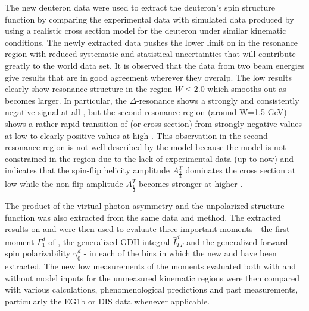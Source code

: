 The new deuteron data were used to extract the deuteron's spin structure function \gones by 
comparing the experimental data with simulated data produced by using a 
realistic cross section model for the deuteron under similar kinematic conditions. %
%
The newly extracted data pushes the lower limit on \qsqs in the resonance region with reduced 
systematic and statistical uncertainties that will contribute greatly to the world data set. 
It is observed that the data from two beam energies give results that are in good agreement 
wherever they overalp. The low \qsqs results clearly show resonance structure in the region 
$W \le 2.0$ which smooths out as \qsqs becomes larger. In particular, the $\Delta$-resonance 
shows a strongly and consistently negative signal at all \qsq, but the second resonance region 
(around W=1.5 GeV) shows a rather %
rapid transition of \gones (or cross section) from 
strongly negative values at low \qsqs to clearly positive values at high \qsq. 
This observation in the second resonance region 
is not well described by the model because the model is not constrained in the region due to the lack 
of experimental data (up to now) and indicates that the spin-flip helicity amplitude $A^T_{\frac{3}{2}}$ dominates 
the cross section at low \qsqs while the non-flip amplitude $A^T_{\frac{1}{2}}$ becomes stronger 
at higher \qsq.


The product \afones of the virtual photon asymmetry \aones and the unpolarized structure function 
\fones was also extracted from the same %
data %
and method.
The extracted results on \gones and \afones were then used to evaluate %
three important moments - the first moment $\Gamma^d_1$ of \gone, the generalized GDH integral $\bar{I}^d_{TT}$ and the generalized forward spin polarizability $\gamma^d_0$ - in each of the \qsqs bins in which the new \gones and \afones have been extracted. The new low \qsqs measurements of the moments evaluated both with and without model inputs for the unmeasured kinematic regions were then compared with various \chipts calculations, phenomenological predictions and past measurements, particularly the EG1b or DIS data whenever applicable.


